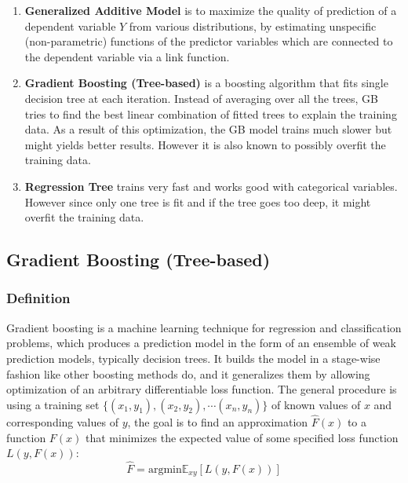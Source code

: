 \documentclass[11pt]{article}
\begin{document}
\begin{enumerate}[(1)]
\setlength\itemsep{0cm}

\item \textbf{Generalized Additive Model} is to maximize the quality of prediction of a dependent variable $Y$ from various distributions, by estimating unspecific (non-parametric) functions of the predictor variables which are connected to the dependent variable via a link function.

\item \textbf{Gradient Boosting (Tree-based)} is a boosting algorithm that fits single decision tree at each iteration. Instead of averaging over all the trees, GB tries to find the best linear combination of fitted trees to explain the training data. As a result of this optimization, the GB model trains much slower but might yields better results. However it is also known to possibly overfit the training data.

\item \textbf{Regression Tree} trains very fast and works good with categorical variables. However since only one tree is fit and if the tree goes too deep, it might overfit the training data.



\end{enumerate}

\subsection{Gradient Boosting (Tree-based)}

\subsubsection{Definition}

Gradient boosting is a machine learning technique for regression and classification problems, which produces a prediction model in the form of an ensemble of weak prediction models, typically decision trees. It builds the model in a stage-wise fashion like other boosting methods do, and it generalizes them by allowing optimization of an arbitrary differentiable loss function. The general procedure is using a training set $\{(x_1,y_1),(x_2,y_2),\cdots(x_n,y_n)\}$ of known values of $x$ and corresponding values of $y$, the goal is to find an approximation $\hat F(x)$ to a function $F(x)$ that minimizes the expected value of some specified loss function $L(y, F(x))$:
\begin{equation}
\hat F = \text{argmin} \mathbb{E}_{xy}[L(y,F(x))]
\end{equation}
\end{document}
